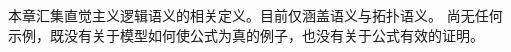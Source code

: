 \documentclass[../../../include/open-logic-chapter]{subfiles}
\begin{document}

\begin{editorial}
  本章汇集直觉主义逻辑语义的相关定义。目前仅涵盖语义与拓扑语义。
  尚无任何示例，既没有关于模型如何使公式为真的例子，也没有关于公式有效的证明。
\end{editorial}


\OLEndChapterHook
\end{document}
